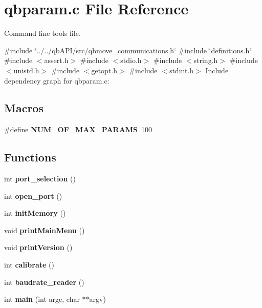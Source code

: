 \section{qbparam.\+c File Reference}
\label{qbparam_8c}


Command line tools file.  


{\ttfamily \#include \char`\"{}../../qb\+A\+P\+I/src/qbmove\+\_\+communications.\+h\char`\"{}}\newline
{\ttfamily \#include \char`\"{}definitions.\+h\char`\"{}}\newline
{\ttfamily \#include $<$assert.\+h$>$}\newline
{\ttfamily \#include $<$stdio.\+h$>$}\newline
{\ttfamily \#include $<$string.\+h$>$}\newline
{\ttfamily \#include $<$unistd.\+h$>$}\newline
{\ttfamily \#include $<$getopt.\+h$>$}\newline
{\ttfamily \#include $<$stdint.\+h$>$}\newline
Include dependency graph for qbparam.\+c\+:
\subsection*{Macros}
\begin{DoxyCompactItemize}
\item 
\mbox{\label{qbparam_8c_a1631ab57d507b38c3bd2bde962254ac4}} 
\#define {\bfseries N\+U\+M\+\_\+\+O\+F\+\_\+\+M\+A\+X\+\_\+\+P\+A\+R\+A\+MS}~100
\end{DoxyCompactItemize}
\subsection*{Functions}
\begin{DoxyCompactItemize}
\item 
\mbox{\label{qbparam_8c_a3939d4ef4a0e2be02b1eb9e1994ec985}} 
int {\bfseries port\+\_\+selection} ()
\item 
\mbox{\label{qbparam_8c_abe553924eef0ba8079dc745caf1f348c}} 
int {\bfseries open\+\_\+port} ()
\item 
\mbox{\label{qbparam_8c_a564e2594b1cf22357d72b2e2cf7fdaf3}} 
int {\bfseries init\+Memory} ()
\item 
\mbox{\label{qbparam_8c_af9dce1973196a5934ee5ec20ea417324}} 
void {\bfseries print\+Main\+Menu} ()
\item 
\mbox{\label{qbparam_8c_a9c4b081f1e1ad60def15811c71a936f2}} 
void {\bfseries print\+Version} ()
\item 
\mbox{\label{qbparam_8c_aa78cef14864eb28be4f47d1ebf0e29f1}} 
int {\bfseries calibrate} ()
\item 
int \textbf{ baudrate\+\_\+reader} ()
\item 
\mbox{\label{qbparam_8c_a3c04138a5bfe5d72780bb7e82a18e627}} 
int {\bfseries main} (int argc, char $\ast$$\ast$argv)
\end{DoxyCompactItemize}
